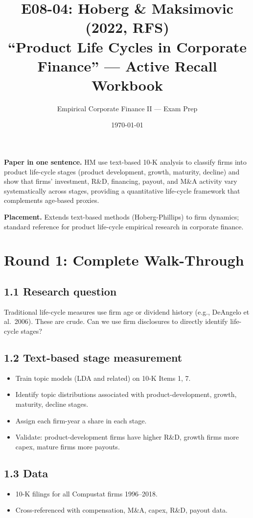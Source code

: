 \documentclass[11pt]{article}
\title{E08-04: Hoberg \& Maksimovic (2022, RFS) \\
\large ``Product Life Cycles in Corporate Finance'' --- Active Recall Workbook}
\author{Empirical Corporate Finance II --- Exam Prep}
\date{\today}
\begin{document}
\maketitle

\begin{keybox}
\textbf{Paper in one sentence.} HM use text-based 10-K analysis to classify firms into product life-cycle stages (product development, growth, maturity, decline) and show that firms' investment, R\&D, financing, payout, and M\&A activity vary systematically across stages, providing a quantitative life-cycle framework that complements age-based proxies.

\textbf{Placement.} Extends text-based methods (Hoberg-Phillips) to firm dynamics; standard reference for product life-cycle empirical research in corporate finance.
\end{keybox}

\section*{Round 1: Complete Walk-Through}

\subsection*{1.1 Research question}
Traditional life-cycle measures use firm age or dividend history (e.g., DeAngelo et al.\ 2006). These are crude. Can we use firm disclosures to directly identify life-cycle stages?

\subsection*{1.2 Text-based stage measurement}
\begin{itemize}
\item Train topic models (LDA and related) on 10-K Items 1, 7.
\item Identify topic distributions associated with product-development, growth, maturity, decline stages.
\item Assign each firm-year a share in each stage.
\item Validate: product-development firms have higher R\&D, growth firms more capex, mature firms more payouts.
\end{itemize}

\subsection*{1.3 Data}
\begin{itemize}
\item 10-K filings for all Compustat firms 1996--2018.
\item Cross-referenced with compensation, M\&A, capex, R\&D, payout data.
\end{itemize}
\end{document}
